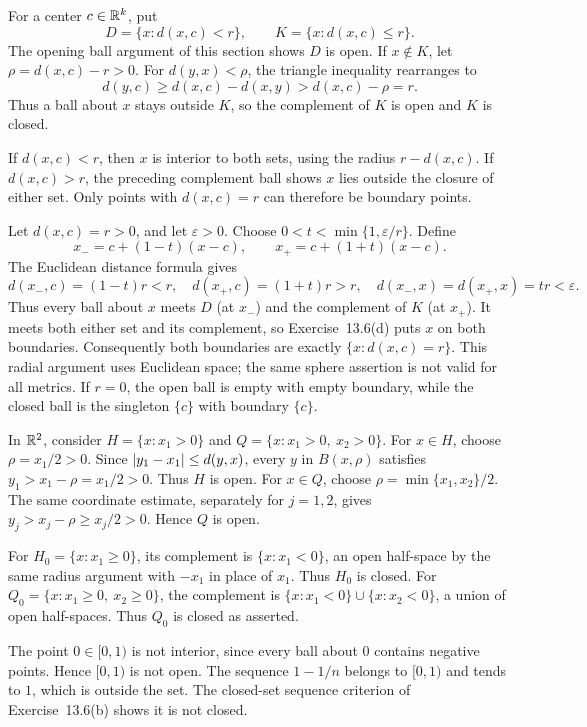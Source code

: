 For a center $c\in\mathbb{R}^k$, put
\[
 D=\{x:d(x,c)<r\},\qquad K=\{x:d(x,c)\le r\}.
\]
The opening ball argument of this section shows $D$ is open.
If $x\notin K$, let $\rho=d(x,c)-r>0$. For
$d(y,x)<\rho$, the triangle inequality rearranges to
\[
 d(y,c)\ge d(x,c)-d(x,y)>d(x,c)-\rho=r.
\]
Thus a ball about $x$ stays outside $K$, so the complement
of $K$ is open and $K$ is closed.

If $d(x,c)<r$, then $x$ is interior to both sets, using the
radius $r-d(x,c)$. If $d(x,c)>r$, the preceding complement
ball shows $x$ lies outside the closure of either set.
Only points with $d(x,c)=r$ can therefore be boundary points.

Let $d(x,c)=r>0$, and let $\varepsilon>0$. Choose
$0<t<\min\{1,\varepsilon/r\}$. Define
\[
 x_-=c+(1-t)(x-c),\qquad x_+=c+(1+t)(x-c).
\]
The Euclidean distance formula gives
\[
 d(x_-,c)=(1-t)r<r,\quad d(x_+,c)=(1+t)r>r,
 \quad d(x_-,x)=d(x_+,x)=tr<\varepsilon.
\]
Thus every ball about $x$ meets $D$ (at $x_-$) and the
complement of $K$ (at $x_+$). It meets both either set and
its complement, so Exercise~13.6(d) puts $x$ on both boundaries.
Consequently both boundaries are exactly $\{x:d(x,c)=r\}$.
This radial argument uses Euclidean space; the same sphere
assertion is not valid for all metrics. If $r=0$, the open ball
is empty with empty boundary, while the closed ball is the
singleton $\{c\}$ with boundary $\{c\}$.

In $\mathbb{R}^2$, consider $H=\{x:x_1>0\}$ and
$Q=\{x:x_1>0,\ x_2>0\}$. For $x\in H$, choose
$\rho=x_1/2>0$. Since $\left|y_1-x_1\right|\le d(y,x)$,
every $y$ in $B(x,\rho)$ satisfies
$y_1>x_1-\rho=x_1/2>0$. Thus $H$ is open.
For $x\in Q$, choose $\rho=\min\{x_1,x_2\}/2$.
The same coordinate estimate, separately for $j=1,2$,
gives $y_j>x_j-\rho\ge x_j/2>0$. Hence $Q$ is open.

For $H_0=\{x:x_1\ge0\}$, its complement is
$\{x:x_1<0\}$, an open half-space by the same radius argument
with $-x_1$ in place of $x_1$. Thus $H_0$ is closed.
For $Q_0=\{x:x_1\ge0,\ x_2\ge0\}$, the complement is
$\{x:x_1<0\}\cup\{x:x_2<0\}$, a union of open half-spaces.
Thus $Q_0$ is closed as asserted.

The point $0\in[0,1)$ is not interior, since every ball about
$0$ contains negative points. Hence $[0,1)$ is not open.
The sequence $1-1/n$ belongs to $[0,1)$ and tends to $1$,
which is outside the set. The closed-set sequence criterion
of Exercise~13.6(b) shows it is not closed.

